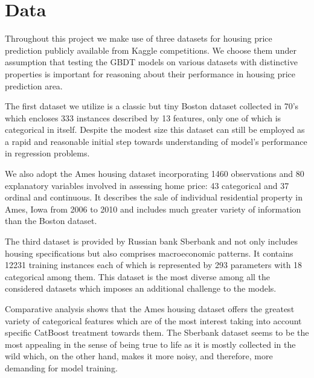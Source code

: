 \section{Data}
\label{sec:data}
Throughout this project we make use of three datasets for housing price prediction publicly available from Kaggle competitions. We choose them under assumption that testing the GBDT models on various datasets with distinctive properties is important for reasoning about their performance in housing price prediction area. 

The first dataset we utilize is a classic but tiny Boston dataset \cite{boston1978housing} collected in 70's which encloses 333 instances described by 13 features, only one of which is categorical in itself. Despite the modest size this dataset can still be employed as a rapid and reasonable initial step towards understanding of model's performance in regression problems.

We also adopt the Ames housing dataset \cite{de2011ames} incorporating 1460 observations and 80 explanatory variables involved in assessing home price: 43 categorical and 37 ordinal and continuous. It describes the sale of individual residential property in Ames, Iowa from 2006 to 2010 and includes much greater variety of information than the Boston dataset.

The third dataset is provided by Russian bank Sberbank \cite{sberbank2017housing} and not only includes housing specifications but also comprises macroeconomic patterns. It contains 12231 training instances each of which is represented by 293 parameters with 18 categorical among them. This dataset is the most diverse among all the considered datasets which imposes an additional challenge to the models.

Comparative analysis shows that the Ames housing dataset offers the greatest variety of categorical features which are of the most interest taking into account specific CatBoost treatment towards them. The Sberbank dataset seems to be the most appealing in the sense of being true to life as it is mostly collected in the wild which, on the other hand, makes it more noisy, and therefore, more demanding for model training.
